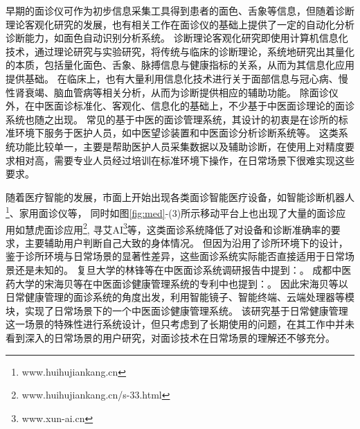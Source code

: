 早期的面诊仪可作为初步信息采集工具得到患者的面色、舌象等信息，但随着诊断理论客观化研究的发展，也有相关工作在面诊仪的基础上提供了一定的自动化分析诊断能力，如面色自动识别分析系统\cite{崔骥2018人工智能背景下中医诊疗技术的应用与展望}。
诊断理论客观化研究即使用计算机信息化技术，通过理论研究与实验研究，将传统与临床的诊断理论，系统地研究出其量化的本质，包括量化面色、舌象、脉搏信息与健康指标的关系，从而为其信息化应用提供基础\cite{Wang2013TCM, guo2015analysis, li2020tcminet}。
在临床上，也有大量利用信息化技术进行关于面部信息与冠心病、慢性肾衰竭、脑血管病等相关分析，从而为诊断提供相应的辅助功能\cite{崔骥2018人工智能背景下中医诊疗技术的应用与展望}。
除面诊仪外，在中医面诊标准化、客观化、信息化的基础上，不少基于中医面诊理论的面诊系统也随之出现。
常见的基于中医的面诊管理系统，其设计的初衷是在诊所的标准环境下服务于医护人员，如中医望诊装置\cite{李国正0一种用于中医望诊的三维图像采集装置}和中医面诊分析诊断系统等\cite{李福凤2016中医面诊分析与诊断系统}。
这类系统功能比较单一，主要是帮助医护人员采集数据以及辅助诊断，在使用上对精度要求相对高，需要专业人员经过培训在标准环境下操作，在日常场景下很难实现这些要求。

随着医疗智能的发展，市面上开始出现各类面诊智能医疗设备，如智能诊断机器人\footnote{www.huihujiankang.cn}、家用面诊仪等，
同时如图\ref{fig:med}-(3)所示移动平台上也出现了大量的面诊应用如慧虎面诊应用\footnote{www.huihujiankang.cn/s-33.html}, 寻艾AI\footnote{www.xun-ai.cn}等，这类面诊系统降低了对设备和诊断准确率的要求，主要辅助用户判断自己大致的身体情况。
但因为沿用了诊所环境下的设计，鉴于诊所环境与日常场景的显著性差异，这些面诊系统实际能否直接适用于日常场景还是未知的。
复旦大学的林锋\cite{林锋2019中医面诊系统调研报告}等在中医面诊系统调研报告中提到：。
成都中医药大学的宋海贝\cite{宋海贝2019中医面诊健康管理系统}等在中医面诊健康管理系统的专利中也提到：。
因此宋海贝等以日常健康管理的面诊系统的角度出发，利用智能镜子、智能终端、云端处理器等模块，实现了日常场景下的一个中医面诊健康管理系统。
该研究基于日常健康管理这一场景的特殊性进行系统设计，但只考虑到了长期使用的问题，在其工作中并未看到深入的日常场景的用户研究，对面诊技术在日常场景的理解还不够充分。

